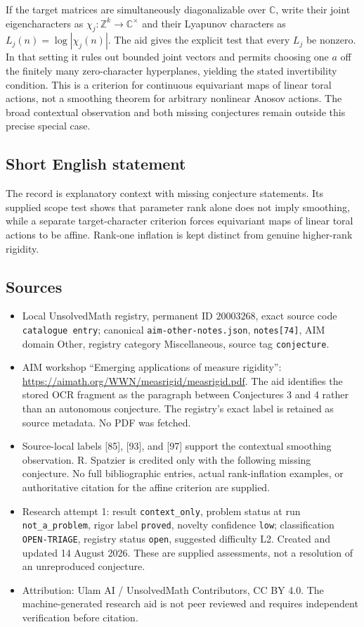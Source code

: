 \documentclass[11pt]{article}
\newcommand{\Z}{\mathbb{Z}}
\newcommand{\C}{\mathbb{C}}
\begin{document}
If the target matrices are simultaneously diagonalizable over \(\C\), write their joint eigencharacters as \(\chi_j:\Z^k\to\C^\times\) and their Lyapunov characters as \(L_j(n)=\log|\chi_j(n)|\). The aid gives the explicit test that every \(L_j\) be nonzero. In that setting it rules out bounded joint vectors and permits choosing one \(a\) off the finitely many zero-character hyperplanes, yielding the stated invertibility condition. This is a criterion for continuous equivariant maps of linear toral actions, not a smoothing theorem for arbitrary nonlinear Anosov actions. The broad contextual observation and both missing conjectures remain outside this precise special case.
\subsection{Short English statement}
The record is explanatory context with missing conjecture statements. Its supplied scope test shows that parameter rank alone does not imply smoothing, while a separate target-character criterion forces equivariant maps of linear toral actions to be affine. Rank-one inflation is kept distinct from genuine higher-rank rigidity.
\subsection{Sources}
\begin{itemize}
\item Local UnsolvedMath registry, permanent ID \(20003268\), exact source code \texttt{catalogue entry}; canonical \texttt{aim-other-notes.json}, \texttt{notes[74]}, AIM domain Other, registry category Miscellaneous, source tag \texttt{conjecture}.
\item AIM workshop ``Emerging applications of measure rigidity'': \url{https://aimath.org/WWN/measrigid/measrigid.pdf}. The aid identifies the stored OCR fragment as the paragraph between Conjectures 3 and 4 rather than an autonomous conjecture. The registry's exact label is retained as source metadata. No PDF was fetched.
\item Source-local labels [85], [93], and [97] support the contextual smoothing observation. R. Spatzier is credited only with the following missing conjecture. No full bibliographic entries, actual rank-inflation examples, or authoritative citation for the affine criterion are supplied.
\item Research attempt 1: result \texttt{context\_only}, problem status at run \texttt{not\_a\_problem}, rigor label \texttt{proved}, novelty confidence \texttt{low}; classification \texttt{OPEN-TRIAGE}, registry status \texttt{open}, suggested difficulty L2. Created and updated 14 August 2026. These are supplied assessments, not a resolution of an unreproduced conjecture.
\item Attribution: Ulam AI / UnsolvedMath Contributors, CC BY 4.0. The machine-generated research aid is not peer reviewed and requires independent verification before citation.
\end{itemize}
\end{document}
